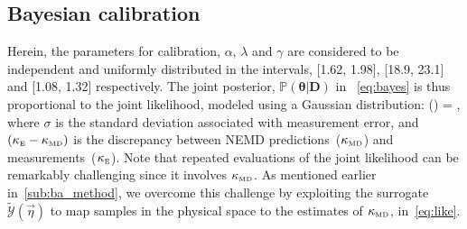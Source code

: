 \subsection{Bayesian calibration}
\label{sub:ba}

Herein, the parameters for calibration, $\alpha$, $\lambda$ and $\gamma$ are considered to be independent and
uniformly distributed in the intervals, [1.62, 1.98], [18.9, 23.1] and [1.08, 1.32] respectively.
The joint posterior, $\mathbb{P}(\bm{\theta}\vert \bm{D})$ in ~\eqref{eq:bayes} is thus 
proportional to the joint likelihood, modeled using a Gaussian distribution:
%
\be
{}(\vert\bm{\theta}) = \exp{},
\label{eq:like}
\ee
%
\noindent where $\sigma$ is the standard deviation associated with measurement error, and
$(\kappa_{\tiny{\mbox{E}}} - \kappa_{\tiny{\mbox{MD}}})$ is the discrepancy between 
NEMD predictions~($\kappa_{\tiny{\mbox{MD}}}$) and measurements~($\kappa_{\tiny{\mbox{E}}}$). 
Note that repeated evaluations of the joint likelihood can be remarkably challenging since it involves 
$\kappa_{\tiny{\mbox{MD}}}$. As mentioned earlier in~\ref{sub:ba_method}, we overcome this challenge by
exploiting the surrogate
$\tilde{\mathcal{Y}}(\vec{\eta})$ to map samples in the physical space to the estimates of 
$\kappa_{\tiny{\mbox{MD}}}$, in~\eqref{eq:like}.

